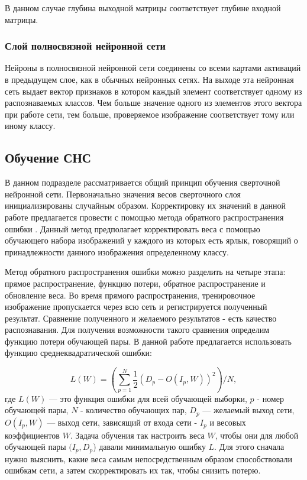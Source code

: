 \documentclass[14pt]{article}
\numberwithin{figure}{section}
\numberwithin{equation}{section}
\begin{document}
В данном случае глубина выходной матрицы соответствует глубине входной матрицы.

\subsubsection{Слой полносвязной нейронной сети}

Нейроны в полносвязной нейронной сети соединены со всеми картами активаций в предыдущем слое, как в обычных нейронных сетях. На выходе эта нейронная сеть выдает вектор признаков в котором каждый элемент соответствует одному из распознаваемых классов. Чем больше значение одного из элементов этого вектора при работе сети, тем больше, проверяемое изображение соответствует тому или иному классу.

\newpage

\subsection{Обучение СНС}

В данном подразделе рассматривается общий принцип обучения сверточной нейронной сети. Первоначально значения весов сверточного слоя инициализированы случайным образом. Корректировку их значений в данной работе предлагается провести с помощью метода обратного распространения ошибки \cite{MNBackProb}. Данный метод предполагает корректировать веса с помощью обучающего набора изображений у каждого из которых есть ярлык, говорящий о принадлежности данного изображения определенному классу.

Метод обратного распространения ошибки можно разделить на четыре этапа: прямое распространение, функцию потери, обратное распространение и обновление веса. Во время прямого распространения, тренировочное изображение пропускается через всю сеть и регистрируется полученный результат. Сравнение полученного и желаемого результатов - есть качество распознавания. Для получения возможности такого сравнения определим функцию потери обучающей пары. В данной работе предлагается использовать функцию среднеквадратической ошибки:

\begin{equation}
    L(W) = (\sum\limits_{p = 1}^{N} \frac{1}{2}(D_p - O(I_p, W))^2) / N,
\end{equation}
где $L(W)$ — это функция ошибки для всей обучающей выборки, $p$ - номер обучающей пары, $N$ - количество обучающих пар, $D_p$ — желаемый выход сети, $O(I_p,W)$ — выход сети, зависящий от входа сети - $I_p$ и весовых коэффициентов $W$. Задача обучения так настроить веса $W$, чтобы они для любой обучающей пары $(I_p,D_p$) давали минимальную ошибку $L$. Для этого сначала нужно выяснить, какие веса самым непосредственным образом способствовали ошибкам сети, а затем скорректировать их так, чтобы снизить потерю.
\end{document}
